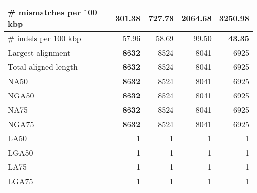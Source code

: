 \documentclass[12pt,a4paper]{article}
\begin{document}
\begin{table}[ht]
\begin{center}
\begin{tabular}{|l*{4}{|r}|}
\# mismatches per 100 kbp & {\bf 301.38} & 727.78 & 2064.68 & 3250.98 \\ \hline
\# indels per 100 kbp & 57.96 & 58.69 & 99.50 & {\bf 43.35} \\ \hline
Largest alignment & {\bf 8632} & 8524 & 8041 & 6925 \\ \hline
Total aligned length & {\bf 8632} & 8524 & 8041 & 6925 \\ \hline
NA50 & {\bf 8632} & 8524 & 8041 & 6925 \\ \hline
NGA50 & {\bf 8632} & 8524 & 8041 & 6925 \\ \hline
NA75 & {\bf 8632} & 8524 & 8041 & 6925 \\ \hline
NGA75 & {\bf 8632} & 8524 & 8041 & 6925 \\ \hline
LA50 & 1 & 1 & 1 & 1 \\ \hline
LGA50 & 1 & 1 & 1 & 1 \\ \hline
LA75 & 1 & 1 & 1 & 1 \\ \hline
LGA75 & 1 & 1 & 1 & 1 \\ \hline
\end{tabular}
\end{center}
\end{table}
\end{document}
